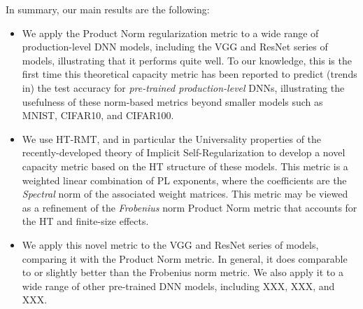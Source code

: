 In summary, our main results are the following:
\begin{itemize}
\item
We apply the Product Norm regularization metric to a wide range of production-level DNN models, including the VGG and ResNet series of models, illustrating that it performs quite well.
To our knowledge, this is the first time this theoretical capacity metric has been reported to predict (trends in) the test accuracy for \emph{pre-trained production-level} DNNs, illustrating the usefulness of these norm-based metrics beyond smaller models such as MNIST, CIFAR10, and CIFAR100. 
\item
We use HT-RMT, and in particular the Universality properties of the recently-developed theory of Implicit Self-Regularization to develop a novel capacity metric based on the HT structure of these models.
This metric is a weighted linear combination of PL exponents, where the coefficients are the \emph{Spectral} norm of the associated weight matrices.
This metric may be viewed as a refinement of the \emph{Frobenius} norm Product Norm metric that accounts for the HT and finite-size effects.
\item
We apply this novel metric to the VGG and ResNet series of models, comparing it with the Product Norm metric.
In general, it does comparable to or slightly better than the Frobenius norm metric.
We also apply it to a wide range of other pre-trained DNN models, including XXX, XXX, and XXX.
\end{itemize}

